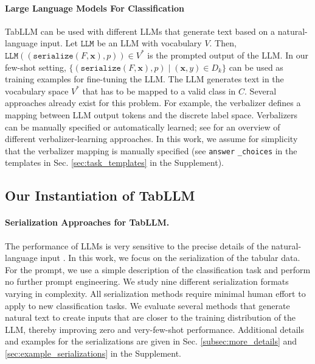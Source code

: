 \paragraph{Large Language Models For Classification} TabLLM can be used with different LLMs that generate text based on a natural-language input. Let $\texttt{LLM}$ be an LLM with vocabulary $V$. Then, $\texttt{LLM}((\texttt{serialize}(F, \mathbf{x}), p)) \in V^*$ is the prompted output of the LLM. In our few-shot setting, $\{(\texttt{serialize}(F, \mathbf{x}), p) \mid  (\mathbf{x}, y) \in D_k\}$ can be used as training examples for fine-tuning the LLM. The LLM generates text in the vocabulary space $V^*$ that has to be mapped to a valid class in $C$. Several approaches already exist for this problem. For example, the verbalizer \citep{schick_exploiting_2021} defines a mapping between LLM output tokens and the discrete label space. Verbalizers can be manually specified or automatically learned; see \citet{cui-etal-2022-prototypical} for an overview of different verbalizer-learning approaches. In this work, we assume for simplicity that the verbalizer mapping is manually specified (see  \texttt{answer} \texttt{\_choices} in the templates in Sec.  \ref{sec:task_templates} in the Supplement).

\subsection{Our Instantiation of TabLLM}

\paragraph{Serialization Approaches for TabLLM.} The performance of LLMs is very sensitive to the precise details of the natural-language input \citep{zhao_calibrate_2021, webson_prompt-based_2022}. In this work, we focus on the serialization of the tabular data. For the prompt, we use a simple description of the classification task and perform no further prompt engineering. We study nine different serialization formats varying in complexity. All serialization methods require minimal human effort to apply to new classification tasks. We evaluate several methods that generate natural text to create inputs that are closer to the training distribution of the LLM, thereby improving zero and very-few-shot performance. Additional details and examples for the serializations are given in Sec. \ref{subsec:more_details} and \ref{sec:example_serializations} in the Supplement.

